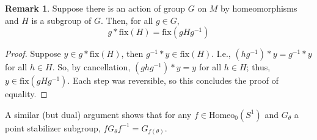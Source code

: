 \documentclass[10pt, oneside]{article}
\newcommand{\homeoS}{\text{Homeo}_0(S^1)}
\theoremstyle{definition}
\newtheorem{rem}{Remark}
\theoremstyle{definition}
\begin{document}
\begin{rem}
    Suppose there is an action of group $G$ on $M$ by homeomorphisms and $H$ is a subgroup of $G$. Then, for all $g\in G$,
    $$g * \text{fix}(H) = \text{fix}(g H g^{-1})$$
\end{rem}
\begin{proof}
    Suppose $y\in g * \text{fix}(H)$, then $g^{-1}*y\in \text{fix}(H)$. I.e., $(hg^{-1})*y = g^{-1}*y$ for all $h\in H$. So, by cancellation, $(ghg^{-1})*y = y$ for all $h\in H$; thus, $y\in \text{fix}(g H g^{-1})$. Each step was reversible, so this concludes the proof of equality.
\end{proof}

A similar (but dual) argument shows that for any $f\in\homeoS$ and $G_\theta$ a point stabilizer subgroup, $f G_\theta f^{-1} = G_{f(\theta)}$.
\end{document}
